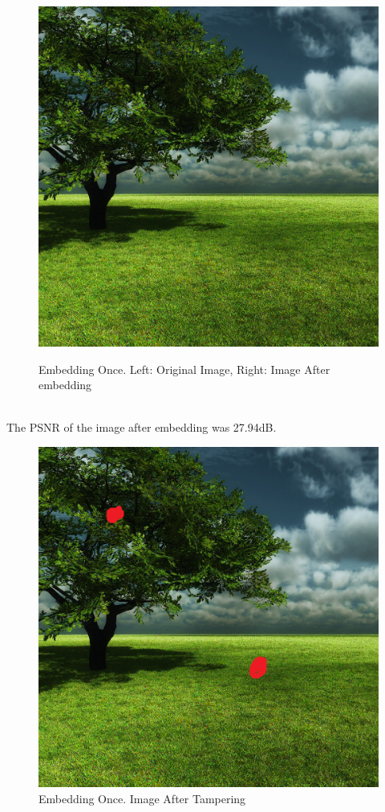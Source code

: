 \documentclass[12pt]{article}
\begin{document}
\begin{figure}[h]
{\includegraphics[scale=0.45]{"Tree Embed once 0.8 threshold/finalImage"}%
}%
\caption{Embedding Once. Left: Original Image, Right: Image After embedding}
\label{fig:treeEmbedOnceEmbedding}
\end{figure}

\hspace{0pt} \\
The PSNR of the image after embedding was 27.94dB.

\begin{figure}[h]
\centerline{%
\includegraphics[scale=0.45]{"Tree Embed once 0.8 threshold/finalImage - Copy"}%
}%
\caption{Embedding Once. Image After Tampering}
\label{fig:treeEmbedOnceTamper}
\end{figure}
\end{document}
